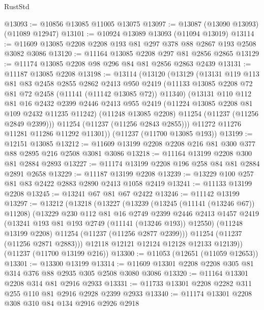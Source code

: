\begin{lexlean}{RustStd}
\begin{coremodule}
@13093 := @10856 @13085 @11005 @13075
@13097 := @13087 (@13090 @13093) (@11089 @12947)
@13101 := @10924 @13089 @13093 (@11094 @13019)
@13114 := @11609 @13085 @2208 @2208 @193 @81 @297 @378 @88 @2867 @193 @2508 @3082 @3086
@13120 := @11164 @13085 @2208 @297 @81 @2856 @2865
@13129 := @11174 @13085 @2208 @98 @296 @84 @81 @2856 @2863 @2439
@13131 := @11187 @13085 @2208
@13198 := @13114
    (@13120
      (@13129
        (@13131
          @119
          @113
          @81
          @83
          @2458
          @2855
          @2862
          @2413
          @950
          @2419
          (@11133 @13085 @2208 @72 @81 @72 @2458 (@11141 (@11142 @13085 @72)) @11340)
          (@13131
            @110
            @112
            @81
            @16
            @2432
            @2399
            @2446
            @2413
            @955
            @2419
            (@11224 @13085 @2208 @81 @109 @2432 @11235 @11242)
            (@11248 @13085 @2208)
            @11254
            (@11237 (@11256 @2849 @2399)))
          @11254
          (@11237 (@11256 @2843 @2855)))
        @11272
        @11276
        @11281
        @11286
        @11292
        @11301))
    (@11237 (@11700 @13085 @193))
@13199 := @12151 @13085
@13212 := @11609 @13199 @2208 @2208 @216 @81 @300 @377 @88 @2895 @216 @2508 @3081 @3086
@13218 := @11164 @13199 @2208 @300 @81 @2884 @2893
@13227 := @11174 @13199 @2208 @196 @258 @84 @81 @2884 @2891 @2658
@13229 := @11187 @13199 @2208
@13239 := @13229 @100 @257 @81 @83 @2422 @2883 @2890 @2413 @1058 @2419
@13241 := @11133 @13199 @2208
@13245 := @13241 @67 @81 @67 @2422
@13246 := @11142 @13199
@13297 := @13212
    (@13218
      (@13227
        (@13239
          (@13245 (@11141 (@13246 @67)) @11208)
          (@13229
            @230
            @112
            @81
            @16
            @2749
            @2399
            @2446
            @2413
            @1457
            @2419
            (@13241 @193 @81 @193 @2749 (@11141 (@13246 @193)) @12550)
            (@11248 @13199 @2208)
            @11254
            (@11237 (@11256 @2877 @2399)))
          @11254
          (@11237 (@11256 @2871 @2883)))
        @12118
        @12121
        @12124
        @12128
        @12133
        @12139))
    (@11237 (@11700 @13199 @216))
@13300 := @11053 (@12651 (@11059 @12653))
@13301 := @13300 @13199
@13314 := @11609 @13301 @2208 @2208 @305 @81 @314 @376 @88 @2935 @305 @2508 @3080 @3086
@13320 := @11164 @13301 @2208 @314 @81 @2916 @2933
@13331 := @11733 @13301 @2208 @2282 @311 @255 @110 @81 @2916 @2928 @2399 @2933
@13340 := @11174 @13301 @2208 @308 @310 @84 @134 @2916 @2926 @2918

\end{coremodule}
\end{lexlean}
